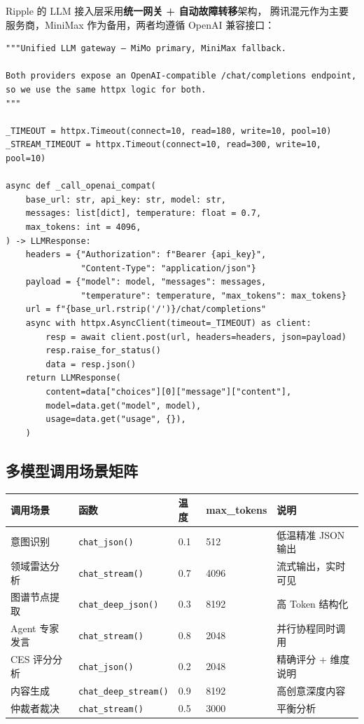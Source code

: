\documentclass[12pt,a4paper]{ctexart}
\begin{document}
Ripple 的 LLM 接入层采用\textbf{统一网关 + 自动故障转移}架构，
腾讯混元作为主要服务商，MiniMax 作为备用，两者均遵循 OpenAI 兼容接口：

\begin{lstlisting}[style=pycode,caption={core/llm.py — LLM 统一网关核心逻辑}]
"""Unified LLM gateway — MiMo primary, MiniMax fallback.

Both providers expose an OpenAI-compatible /chat/completions endpoint,
so we use the same httpx logic for both.
"""

_TIMEOUT = httpx.Timeout(connect=10, read=180, write=10, pool=10)
_STREAM_TIMEOUT = httpx.Timeout(connect=10, read=300, write=10, pool=10)

async def _call_openai_compat(
    base_url: str, api_key: str, model: str,
    messages: list[dict], temperature: float = 0.7,
    max_tokens: int = 4096,
) -> LLMResponse:
    headers = {"Authorization": f"Bearer {api_key}",
               "Content-Type": "application/json"}
    payload = {"model": model, "messages": messages,
               "temperature": temperature, "max_tokens": max_tokens}
    url = f"{base_url.rstrip('/')}/chat/completions"
    async with httpx.AsyncClient(timeout=_TIMEOUT) as client:
        resp = await client.post(url, headers=headers, json=payload)
        resp.raise_for_status()
        data = resp.json()
    return LLMResponse(
        content=data["choices"][0]["message"]["content"],
        model=data.get("model", model),
        usage=data.get("usage", {}),
    )
\end{lstlisting}

\subsection{多模型调用场景矩阵}

\begin{center}
{\small
\begin{tabular}{>{\raggedright\arraybackslash}p{2.8cm} >{\raggedright\arraybackslash}p{3cm} p{1.2cm} p{1.5cm} >{\raggedright\arraybackslash}p{4.5cm}}
\toprule
\textbf{调用场景} & \textbf{函数} & \textbf{温度} & \textbf{max\_tokens} & \textbf{说明} \\
\midrule
意图识别 & \texttt{chat\_json()} & 0.1 & 512 & 低温精准 JSON 输出 \\[2pt]
领域雷达分析 & \texttt{chat\_stream()} & 0.7 & 4096 & 流式输出，实时可见 \\[2pt]
图谱节点提取 & \texttt{chat\_deep\_json()} & 0.3 & 8192 & 高 Token 结构化 \\[2pt]
Agent 专家发言 & \texttt{chat\_stream()} & 0.8 & 2048 & 并行协程同时调用 \\[2pt]
CES 评分分析 & \texttt{chat\_json()} & 0.2 & 2048 & 精确评分 + 维度说明 \\[2pt]
内容生成 & \texttt{chat\_deep\_stream()} & 0.9 & 8192 & 高创意深度内容 \\[2pt]
仲裁者裁决 & \texttt{chat\_stream()} & 0.5 & 3000 & 平衡分析 \\
\bottomrule
\end{tabular}
}
\end{center}
\end{document}
